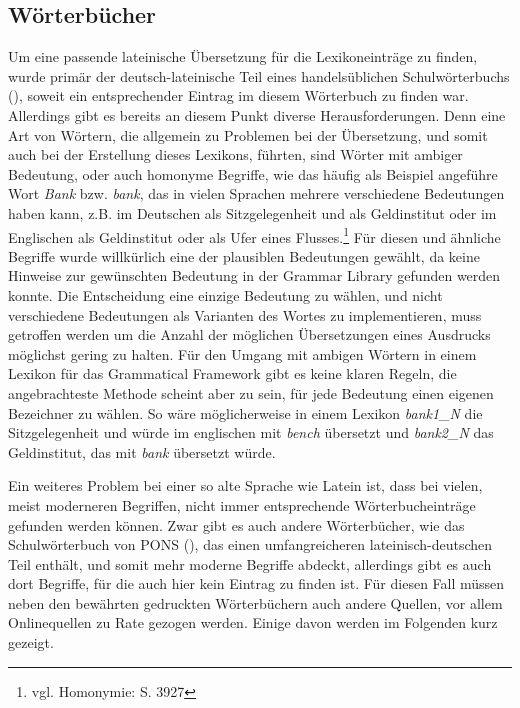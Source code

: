 \documentclass[12pt,abstract=on,titlepage,bibliography=totoc,ngerman,listof=totoc]{scrreprt}
\begin{document}
\subsection{Wörterbücher}
\label{subsec:woerterbuch}
Um eine passende lateinische Übersetzung für die Lexikoneinträge zu finden, wurde primär der deutsch-lateinische Teil eines handelsüblichen Schulwörterbuchs (\cite{LANGENSCHEIDT1981}), soweit ein entsprechender Eintrag im diesem Wörterbuch zu finden war. Allerdings gibt es bereits an diesem Punkt diverse Herausforderungen. Denn eine Art von Wörtern, die allgemein zu Problemen bei der Übersetzung, und somit auch bei der Erstellung dieses Lexikons, führten, sind Wörter mit ambiger Bedeutung, oder auch homonyme Begriffe, wie das häufig als Beispiel angeführe Wort \textit{Bank} bzw. \textit{bank}, das in vielen Sprachen mehrere verschiedene Bedeutungen haben kann, z.B. im Deutschen als Sitzgelegenheit und als Geldinstitut oder im Englischen als Geldinstitut oder als Ufer eines Flusses.\footnote{vgl. \cite{METZLER2004} Homonymie: S. 3927} Für diesen und ähnliche Begriffe wurde willkürlich eine der plausiblen Bedeutungen gewählt, da keine Hinweise zur gewünschten Bedeutung in der Grammar Library gefunden werden konnte. Die Entscheidung eine einzige Bedeutung zu wählen, und nicht verschiedene Bedeutungen als Varianten des Wortes zu implementieren, muss getroffen werden um die Anzahl der möglichen Übersetzungen eines Ausdrucks möglichst gering zu halten. Für den Umgang mit ambigen Wörtern in einem Lexikon für das Grammatical Framework gibt es keine klaren Regeln, die angebrachteste Methode scheint aber zu sein, für jede Bedeutung einen eigenen Bezeichner zu wählen. So wäre möglicherweise in einem Lexikon \textit{bank1\_N} die Sitzgelegenheit und würde im englischen mit \textit{bench} übersetzt und \textit{bank2\_N} das Geldinstitut, das mit \textit{bank} übersetzt würde.\par
Ein weiteres Problem bei einer so alte Sprache wie Latein ist, dass bei vielen, meist moderneren Begriffen, nicht immer entsprechende Wörterbucheinträge gefunden werden können. Zwar gibt es auch andere Wörterbücher, wie das Schulwörterbuch von PONS (\cite{PONS2012}), das einen umfangreicheren lateinisch-deutschen Teil enthält, und somit mehr moderne Begriffe abdeckt, allerdings gibt es auch dort Begriffe, für die auch hier kein Eintrag zu finden ist. Für diesen Fall müssen neben den bewährten gedruckten Wörterbüchern auch andere Quellen, vor allem Onlinequellen zu Rate gezogen werden. Einige davon werden im Folgenden kurz gezeigt.\par
\end{document}
